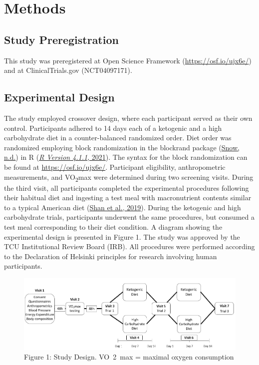\documentclass[]{cik}%
\begin{document}
\hypertarget{methods}{%
\section{Methods}\label{methods}}

\hypertarget{study-preregistration}{%
\subsection{Study Preregistration}\label{study-preregistration}}

This study was preregistered at Open Science Framework
(\url{https://osf.io/ujx6e/}) and at ClinicalTrials.gov (NCT04097171).

\hypertarget{experimental-design}{%
\subsection{Experimental Design}\label{experimental-design}}

The study employed crossover design, where each participant served as
their own control. Participants adhered to 14 days each of a ketogenic
and a high carbohydrate diet in a counter-balanced randomized order.
Diet order was randomized employing block randomization in the blockrand
package (\protect\hyperlink{ref-30}{Snow, n.d.}) in R
(\protect\hyperlink{ref-31}{\emph{R Version 4.1.1}, 2021}). The syntax
for the block randomization can be found at \url{https://osf.io/ujx6e/}.
Participant eligibility, anthropometric measurements, and
VO\textsubscript{2}max were determined during two screening visits.
During the third visit, all participants completed the experimental
procedures following their habitual diet and ingesting a test meal with
macronutrient contents similar to a typical American diet
(\protect\hyperlink{ref-32}{Shan et al., 2019}). During the ketogenic
and high carbohydrate trials, participants underwent the same
procedures, but consumed a test meal corresponding to their diet
condition. A diagram showing the experimental design is presented in
Figure 1. The study was approved by the TCU Institutional Review Board
(IRB). All procedures were performed according to the Declaration of
Helsinki principles for research involving human participants.

\begin{figure}[H]
\includegraphics[width=1\linewidth]{figures/figure1} \caption{Figure 1: Study Design. VO~2~max = maximal oxygen consumption}\label{fig:fig1pdf}
\end{figure}
\end{document}
